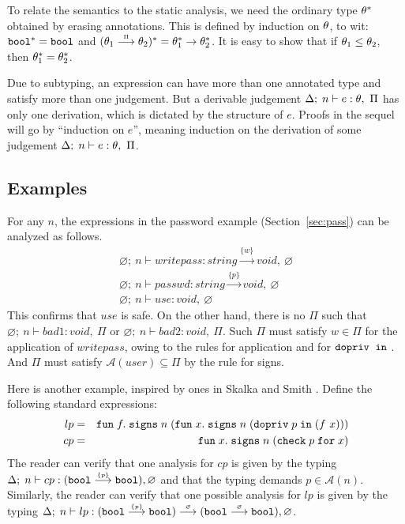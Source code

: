 \documentclass[submission,copyright,creativecommons]{eptcs}
\newcommand{\enable}[2]{\ENABLE\;#1\;\IN\;#2}
\newcommand{\chk}[2]{\CHK\;#1\;\FOR\;#2}
\newcommand{\signs}[2]{\SIGNS\;#1\;#2}
\newcommand{\BOOL}{\mbox{\texttt{bool}}}
\newcommand{\FOR}{\mbox{\texttt{for}}}
\newcommand{\IN}{\mbox{\texttt{in}}}
\newcommand{\A}{\mathcal{A}}
\newcommand{\proves}{\vdash}
\newcommand{\Empty}{\varnothing}
\def\lpields#1{\stackrel{#1}{\longrightarrow}}
\newcommand{\annoto}[1]{\lpields {\scriptscriptstyle #1}}
\newcommand{\ENABLE}{\mbox{\texttt{dopriv}}}
\newcommand{\CHK}{\mbox{\texttt{check}}}
\newcommand{\SIGNS}{\mbox{\texttt{signs}}}
\newcommand{\LAM}[2]{{\mathtt{fun}\; #1.\; #2}}
\newcommand{\n}{n} \newcommand{\p}{p} \newcommand{\Ps}{\Pi} \newcommand{\h}{h}
\begin{document}
To relate the semantics to the static analysis, we need the ordinary type $\theta^*$ obtained
by erasing annotations.
This is defined by induction on $\theta$, to wit: 
$\BOOL^* = \BOOL$ and $(\th_1\annoto{\Ps}\th_2)^* = \th_{1}^*\to\th_{2}^*$.
It is easy to show that if $\theta_1\leq\theta_2$, then $\theta_{1}^*=\theta_{2}^*$.


Due to subtyping, an expression can have more than one annotated type
and satisfy more than one judgement.  But a derivable judgement
$\Delta;\;\n\proves e:\th,~\Ps$ has only one derivation, which is
dictated by the structure of $e$.  Proofs in the sequel will go by
``induction on $e$'', meaning induction on the derivation of some
judgement $\Delta;\;\n\proves e:\th,~\Ps$.




\subsection{Examples}

For any $\n$, the expressions in the password example (Section~\ref{sec:pass}) can be analyzed as follows.
\[
\begin{array}{l}
\Empty; \ \n\proves writepass: string\annoto{\{w\}} void,\ \Empty \\
\Empty; \ \n\proves passwd: string\annoto{\{p\}} void,\ \Empty \\
\Empty; \ \n\proves use:  void,\ \Empty 
\end{array}
\]
This confirms that $use$ is safe.
On the other hand, there is no $\Ps$ such that
$\Empty; \ \n\proves bad1: void,\ \Ps$ or
$\Empty; \ \n\proves bad2: void,\ \Ps$.
Such $\Ps$ must satisfy $w\in\Ps$ for the application of $writepass$, owing to the rules for application and for $\enable{}{}$.  And $\Ps$ must satisfy $\A(user)\subseteq \Ps$ by the rule for signs.



Here is another example, inspired by ones in Skalka and Smith \cite{SkalkaS:ICFP00}.
Define the following standard expressions:
\begin{eqnarray*}
lp &=& \LAM{f}
           {\signs{\n}
                  {(\LAM{x}
                        {\signs{\n}
                               {(\enable{\p}{(f\ x)})}})}} \\
cp &=& \LAM{x}{\signs{\n}
                     {(\chk{\p}{x})}}
\end{eqnarray*}
The reader can verify that one analysis for $cp$ is given by the 
typing $\Delta;\;\n\proves cp:(\BOOL\annoto{\{\p\}}\BOOL), \Empty$
and that the typing demands $\p\in\A(\n)$. Similarly, the reader can verify 
that one possible analysis for $lp$ is given by the typing
$\Delta;\;\n\proves lp:(\BOOL\annoto{\{\p\}}\BOOL)\annoto{\Empty}
(\BOOL\annoto{\Empty}\BOOL), \Empty$.
\end{document}
